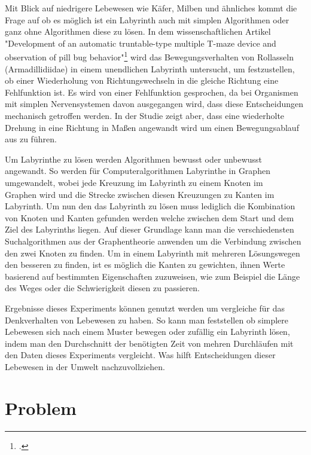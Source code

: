 \documentclass[12pt, a4paper, titlepage]{article}
\begin{document}
\bigskip

Mit Blick auf niedrigere Lebewesen wie Käfer, Milben und ähnliches kommt die Frage auf ob es möglich ist ein Labyrinth auch mit simplen Algorithmen oder ganz ohne Algorithmen diese zu lösen.
In dem wissenschaftlichen Artikel "Development of an automatic truntable-type multiple T-maze device and observation of pill bug behavior"\footcite{bug} wird das Bewegungsverhalten von Rollasseln (Armadillidiidae) in einem unendlichen Labyrinth untersucht, um festzustellen, ob einer Wiederholung von Richtungswechseln in die gleiche Richtung eine Fehlfunktion ist.
Es wird von einer Fehlfunktion gesprochen, da bei Organismen mit simplen Nervensystemen davon ausgegangen wird, dass diese Entscheidungen mechanisch getroffen werden.
In der Studie zeigt aber, dass eine wiederholte Drehung in eine Richtung in Maßen angewandt wird um einen Bewegungsablauf aus zu führen.

\bigskip

Um Labyrinthe zu lösen werden Algorithmen bewusst oder unbewusst angewandt.
So werden für Computeralgorithmen Labyrinthe in Graphen umgewandelt, wobei jede Kreuzung im Labyrinth zu einem Knoten im \\ Graphen wird und die Strecke zwischen diesen Kreuzungen zu Kanten im Labyrinth.
Um nun den das Labyrinth zu lösen muss lediglich die Kombination von Knoten und Kanten gefunden werden welche zwischen dem Start und dem Ziel des Labyrinths liegen.
Auf dieser Grundlage kann man die verschiedensten Suchalgorithmen aus der Graphentheorie anwenden um die Verbindung zwischen den zwei Knoten zu finden.
Um in einem Labyrinth mit mehreren Lösungswegen den besseren zu finden, ist es möglich die Kanten zu gewichten, ihnen Werte basierend auf bestimmten Eigenschaften zuzuweisen, wie zum Beispiel die Länge des Weges oder die Schwierigkeit diesen zu passieren.

\bigskip

Ergebnisse dieses Experiments können genutzt werden um vergleiche für das Denkverhalten von Lebewesen zu haben.
So kann man feststellen ob simplere Lebewesen sich nach einem Muster bewegen oder zufällig ein Labyrinth lösen, indem man den Durchschnitt der benötigten Zeit von mehren Durchläufen mit den Daten dieses Experiments vergleicht.
Was hilft Entscheidungen dieser Lebewesen in der Umwelt nachzuvollziehen.

\newpage

\section{Problem}
\end{document}
